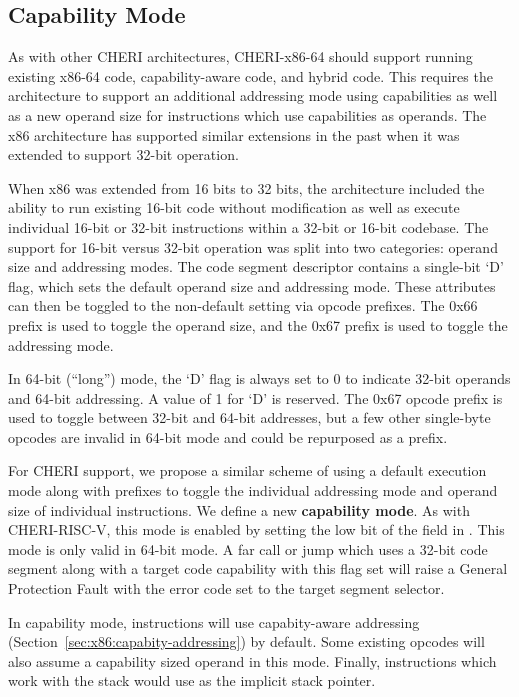 \subsection{Capability Mode}

As with other CHERI architectures, CHERI-x86-64 should support running existing
x86-64 code, capability-aware code, and hybrid code.  This
requires the architecture to support an additional addressing mode
using capabilities as well as a new operand size for instructions
which use capabilities as operands.
The x86 architecture has supported similar extensions in the past when it was
extended to support 32-bit operation.

When x86 was extended from 16 bits to 32 bits, the architecture
included the ability to run existing 16-bit code without modification
as well as execute individual 16-bit or 32-bit instructions within a
32-bit or 16-bit codebase.  The support for 16-bit versus 32-bit
operation was
split into two categories: operand size and addressing modes.  The
code segment descriptor contains a single-bit `D' flag, which sets the
default operand size and addressing mode.  These attributes can then
be toggled to the non-default setting via opcode prefixes.  The 0x66
prefix is used to toggle the operand size, and the 0x67 prefix is used
to toggle the addressing mode.

In 64-bit (``long'') mode, the `D' flag is always set to
0 to indicate 32-bit operands and 64-bit addressing.  A value of
1 for `D' is reserved.  The 0x67 opcode prefix is used to toggle
between 32-bit and 64-bit addresses, but a few other single-byte opcodes
are invalid in 64-bit mode and could be repurposed as a prefix.

For CHERI support, we propose a similar scheme of using a default
execution mode along with prefixes to toggle the individual addressing
mode and operand size of individual instructions.  We define a new
\textbf{capability mode}.  As with CHERI-RISC-V, this mode is enabled
by setting the low bit of the \cflags{} field in \CIP{}.  This mode is
only valid in 64-bit mode.  A far call or jump which uses a 32-bit
code segment along with a target code capability with this flag set
will raise a General Protection Fault with the error code set to the
target segment selector.

In capability mode, instructions will use capabity-aware addressing
(Section~\ref{sec:x86:capabity-addressing}) by default.  Some existing
opcodes will also assume a capability sized operand in this mode.
Finally, instructions which work with the stack would use \CSP{} as
the implicit stack pointer.

